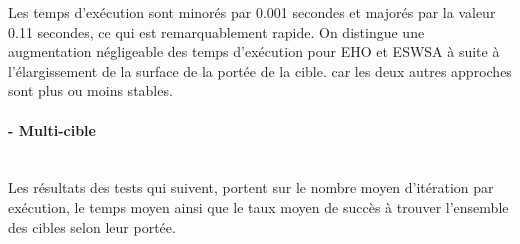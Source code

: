 	Les temps d'exécution sont minorés par 0.001 secondes et majorés par la valeur 0.11 secondes, ce qui est remarquablement rapide.
	On distingue une augmentation négligeable des temps d'exécution pour EHO et ESWSA à suite à l'élargissement de la surface de la portée de la cible. car les deux autres approches sont plus ou moins stables.  


\vspace{-0.1cm}
\noindent
\hspace{-0.5cm}
\begin{minipage}[t]{0.55\textwidth}
	\captionsetup{width=0.8\linewidth}
	\centering{}
	\label{IP1o}
\end{minipage}\hfill
\hspace{-0.5cm}
\begin{minipage}[t]{0.55\textwidth}
	\captionsetup{width=0.8\linewidth}
	\centering{}
	\label{tP1o}
\end{minipage}\hfill





\paragraph{- Multi-cible}
\textbf{ }\\
Les résultats des tests qui suivent, portent sur le nombre moyen d'itération par exécution, le temps moyen ainsi que le taux moyen de succès à trouver l'ensemble des cibles selon leur portée.

